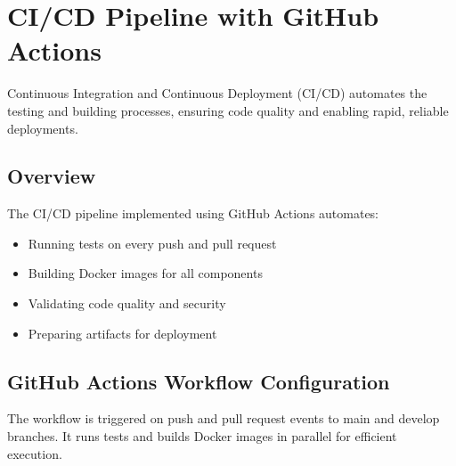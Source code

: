 \documentclass[12pt,a4paper]{article}
\begin{document}

\section{CI/CD Pipeline with GitHub Actions}

Continuous Integration and Continuous Deployment (CI/CD) automates the testing and building processes, ensuring code quality and enabling rapid, reliable deployments.

\subsection{Overview}

The CI/CD pipeline implemented using GitHub Actions automates:
\begin{itemize}
    \item Running tests on every push and pull request
    \item Building Docker images for all components
    \item Validating code quality and security
    \item Preparing artifacts for deployment
\end{itemize}

\subsection{GitHub Actions Workflow Configuration}

The workflow is triggered on push and pull request events to main and develop branches. It runs tests and builds Docker images in parallel for efficient execution.
\end{document}
